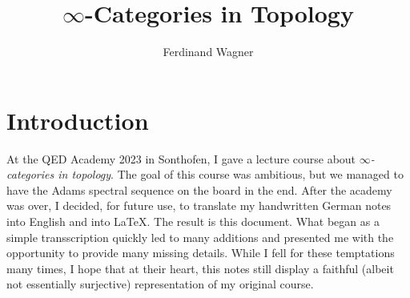\documentclass[DIV=12,numbers=enddot,leqno,bibliography=totoc]{scrartcl}
\title{$\infty$-Categories in Topology}
\author{Ferdinand Wagner}
\begin{document}
	\maketitle

	\tableofcontents
	\addtocounter{section}{-1}
	
	\newpage
	
	
	\renewcommand{\ParagraphOrNot}{\S}
	\section{Introduction}
	At the QED Academy 2023 in Sonthofen, I gave a lecture course about \emph{$\infty$-categories in topology}. The goal of this course was ambitious, but we managed to have the Adams spectral sequence on the board in the end. After the academy was over, I decided, for future use, to translate my handwritten German notes into English and into \LaTeX. The result is this document. What began as a simple transscription quickly led to many additions and presented me with the opportunity to provide many missing details. While I fell for these temptations many times, I hope that at their heart, this notes still display a faithful (albeit not essentially surjective) representation of my original course.
	
\end{document}
